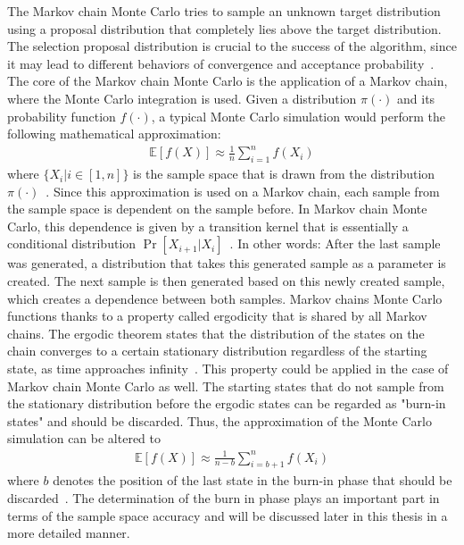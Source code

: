 The Markov chain Monte Carlo tries to sample an unknown target distribution using a proposal distribution that completely lies above the target distribution. The selection proposal distribution is crucial to the success of the algorithm, since it may lead to different behaviors of convergence and acceptance probability~\cite{mcmc_handbook}. The core of the Markov chain Monte Carlo is the application of a Markov chain, where the Monte Carlo integration is used. Given a distribution $\pi(\cdot)$ and its probability function $f(\cdot)$, a typical Monte Carlo simulation would perform the following mathematical approximation:
\begin{align}
\mathbb{E}[f(X)] \approx \frac{1}{n}\sum_{i=1}^{n}f(X_i)
\end{align}
where $\{X_i | i\in[1, n]\}$ is the sample space that is drawn from the distribution $\pi(\cdot)$~\cite{mcmc_practice}. Since this approximation is used on a Markov chain, each sample from the sample space is dependent on the sample before. In Markov chain Monte Carlo, this dependence is given by a transition kernel that is essentially a conditional distribution $\Pr[X_{i+1}|X_i]$~\cite{mcmc_practice}. In other words: After the last sample was generated, a distribution that takes this generated sample as a parameter is created. The next sample is then generated based on this newly created sample, which creates a dependence between both samples. Markov chains Monte Carlo functions thanks to a property called ergodicity that is shared by all Markov chains. The ergodic theorem states that the distribution of the states on the chain converges to a certain stationary distribution regardless of the starting state, as time approaches infinity~\cite{ergodicity}. This property could be applied in the case of Markov chain Monte Carlo as well. The starting states that do not sample from the stationary distribution before the ergodic states can be regarded as "burn-in states" and should be discarded. Thus, the approximation of the Monte Carlo simulation can be altered to
\begin{align}
\mathbb{E}[f(X)] \approx \frac{1}{n-b}\sum_{i=b + 1}^{n}f(X_i)
\end{align}
where $b$ denotes the position of the last state in the burn-in phase that should be discarded~\cite{mcmc_practice}. The determination of the burn in phase plays an important part in terms of the sample space accuracy and will be discussed later in this thesis in a more detailed manner.

